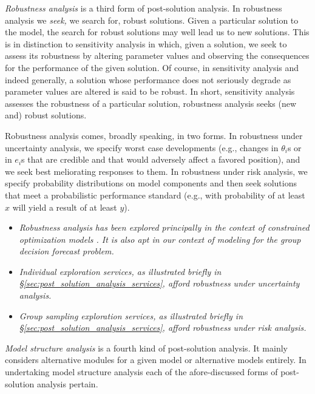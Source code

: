 \emph{Robustness analysis} is a third form of post-solution analysis. In robustness analysis we \emph{seek,} we search for,  robust solutions.  Given a particular solution to the model, the search for robust solutions may well lead us to new solutions. This is in distinction to sensitivity analysis in which, given a solution, we seek to assess its robustness by altering parameter values and observing the consequences for the performance of the given solution.  Of course, in sensitivity analysis and indeed generally, a solution whose performance does not seriously degrade as parameter values are altered is said to be robust.  In short, sensitivity analysis assesses the robustness of a particular solution, robustness analysis seeks (new and) robust solutions.

Robustness analysis comes, broadly speaking, in two forms. In robustness under uncertainty analysis, we specify worst case developments (e.g., changes in  $\theta_i$s or  in $e_i$s that are credible and that would adversely affect a favored   {position}),  and we seek best meliorating responses to them. In robustness under risk analysis, we specify probability distributions on model components and then seek solutions that meet a probabilistic performance standard (e.g., with probability of at least $x$ will yield a result of at least $y$).

\begin{itemize}
\item {\it Robustness analysis has been explored principally in the context of constrained optimization models
\cite{kimbrough_kuo_lau_2011_MIC,ann_kuo_phd}. It is also apt in our context of modeling for the group decision forecast problem. %
}
\item {\it Individual exploration services, as illustrated briefly in \S\ref{sec:post_solution_analysis_services},  afford robustness under uncertainty analysis.}
\item {\it Group sampling exploration services, as illustrated briefly in \S\ref{sec:post_solution_analysis_services},  afford robustness under risk analysis.}
\end{itemize}

\emph{Model structure analysis} is a fourth kind of post-solution analysis. It mainly considers alternative modules for a given model or alternative models entirely. In undertaking model structure analysis each of the afore-discussed forms of post-solution analysis pertain.

